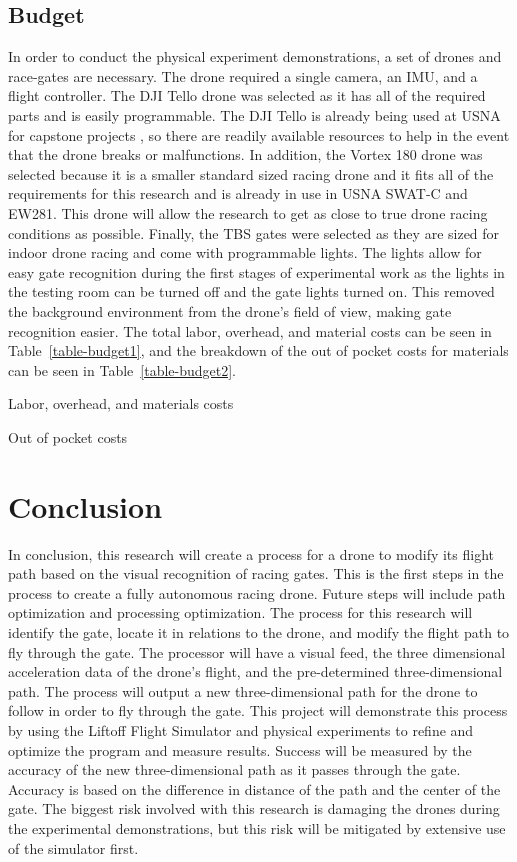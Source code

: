 \documentclass[onecolumn,10pt]{IEEEtran}
\begin{document}
\subsection{Budget}
In order to conduct the physical experiment demonstrations, a set of drones and race-gates are necessary. The drone required a single camera, an IMU, and a flight controller. The DJI Tello drone was selected as it has all of the required parts and is easily programmable. The DJI Tello is already being used at USNA for capstone projects \cite{cuniff2019}, so there are readily available resources to help in the event that the drone breaks or malfunctions. In addition, the Vortex 180 drone was selected because it is a smaller standard sized racing drone and it fits all of the requirements for this research and is already in use in USNA SWAT-C and EW281. This drone will allow the research to get as close to true drone racing conditions as possible. Finally, the TBS gates were selected as they are sized for indoor drone racing and come with programmable lights. The lights allow for easy gate recognition during the first stages of experimental work as the lights in the testing room can be turned off and the gate lights turned on. This removed the background environment from the drone’s field of view, making gate recognition easier. The total labor, overhead, and material costs can be seen in Table~\ref{table-budget1}, and the breakdown of the out of pocket costs for materials can be seen in Table~\ref{table-budget2}.
\begin{table}
\caption{Labor, overhead, and materials costs}
\label{table-budget1}
\end{table}
\begin{table}
\caption{Out of pocket costs}
\label{table-budget2}
\end{table}


\section{Conclusion}
In conclusion, this research will create a process for a drone to modify its flight path based on the visual recognition of racing gates. This is the first steps in the process to create a fully autonomous racing drone. Future steps will include path optimization and processing optimization. The process for this research will identify the gate, locate it in relations to the drone, and modify the flight path to fly through the gate. The processor will have a visual feed, the three dimensional acceleration data of the drone’s flight, and the pre-determined three-dimensional path. The process will output a new three-dimensional path for the drone to follow in order to fly through the gate. This project will demonstrate this process by using the Liftoff Flight Simulator and physical experiments to refine and optimize the program and measure results. Success will be measured by the accuracy of the new three-dimensional path as it passes through the gate. Accuracy is based on the difference in distance of the path and the center of the gate. The biggest risk involved with this research is damaging the drones during the experimental demonstrations, but this risk will be mitigated by extensive use of the simulator first. 
\end{document}
